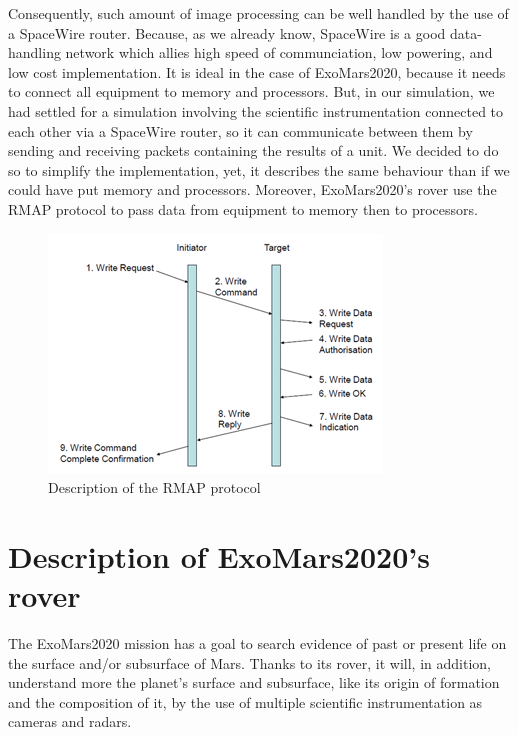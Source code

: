 \documentclass[12pt,a4paper]{article}
\begin{document}
Consequently, such amount of image processing can be well handled by the use of a SpaceWire router. Because, as we already know, SpaceWire is a good data-handling network which allies high speed of communciation, low powering, and low cost implementation. It is ideal in the case of ExoMars2020, because it needs to connect all equipment to memory and processors. But, in our simulation, we had settled for a simulation involving the scientific instrumentation connected to each other via a SpaceWire router, so it can communicate between them by sending and receiving packets containing the results of a unit. We decided to do so to simplify the implementation, yet, it describes the same behaviour than if we could have put memory and processors. Moreover, ExoMars2020's rover use the RMAP protocol to pass data from equipment to memory then to processors.\smallbreak 

\begin{figure}[hb]
	\centering
    \includegraphics[scale = 0.5]{pictures/RMAP_protocol.png}
    \caption{Description of the RMAP protocol}
\end{figure}



\section{Description of ExoMars2020's rover}

The ExoMars2020 mission has a goal to search evidence of past or present life on the surface and/or subsurface of Mars. Thanks to its rover, it will, in addition, understand more the planet's surface and subsurface, like its origin of formation and the composition of it, by the use of multiple scientific instrumentation as cameras and radars.\smallbreak
\end{document}

